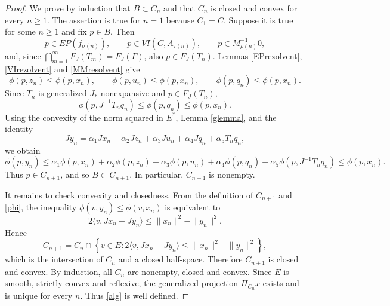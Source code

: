 \documentclass[leqno,12pt]{amsart}
\theoremstyle{definition}
\numberwithin{equation}{section}
\begin{document}
\begin{proof}
We prove by induction that $B\subset C_n$ and that $C_n$ is closed and convex for every $n\geq1$. The assertion is true for $n=1$ because $C_1=C$. Suppose it is true for some $n\geq1$ and fix $p\in B$. Then
\[
p\in EP(f_{\sigma(n)}),\qquad p\in VI(C,A_{\tau(n)}),\qquad
p\in M_{\rho(n)}^{-1}0,
\]
and, since $\bigcap_{m=1}^{\infty}F_J(T_m)=F_J(\Gamma)$, also $p\in F_J(T_n)$. Lemmas \ref{EPrezolvent}, \ref{VIrezolvent} and \ref{MMresolvent} give
\[
\phi(p,z_n)\leq\phi(p,x_n),\qquad
\phi(p,u_n)\leq\phi(p,x_n),\qquad
\phi(p,q_n)\leq\phi(p,x_n).
\]
Since $T_n$ is generalized $J_{*}$-nonexpansive and $p\in F_J(T_n)$,
\[
\phi(p,J^{-1}T_nq_n)\leq \phi(p,q_n)\leq \phi(p,x_n).
\]
Using the convexity of the norm squared in $E^{*}$, Lemma \ref{glemma}, and the identity
\[
Jy_n=\alpha_1Jx_n+\alpha_2Jz_n+\alpha_3Ju_n+\alpha_4Jq_n+\alpha_5T_nq_n,
\]
we obtain
\[
\phi(p,y_n)\leq
\alpha_1\phi(p,x_n)+\alpha_2\phi(p,z_n)+\alpha_3\phi(p,u_n)
+\alpha_4\phi(p,q_n)+\alpha_5\phi(p,J^{-1}T_nq_n)
\leq \phi(p,x_n).
\]
Thus $p\in C_{n+1}$, and so $B\subset C_{n+1}$. In particular, $C_{n+1}$ is nonempty.

It remains to check convexity and closedness. From the definition of $C_{n+1}$ and \eqref{phi}, the inequality $\phi(v,y_n)\leq\phi(v,x_n)$ is equivalent to
\[
2\langle v,Jx_n-Jy_n\rangle\leq \|x_n\|^2-\|y_n\|^2.
\]
Hence
\[
C_{n+1}=C_n\cap
\left\{v\in E:2\langle v,Jx_n-Jy_n\rangle\leq\|x_n\|^2-\|y_n\|^2\right\},
\]
which is the intersection of $C_n$ and a closed half-space. Therefore $C_{n+1}$ is closed and convex. By induction, all $C_n$ are nonempty, closed and convex. Since $E$ is smooth, strictly convex and reflexive, the generalized projection $\Pi_{C_n}x$ exists and is unique for every $n$. Thus \eqref{alg} is well defined.
\end{proof}
\end{document}
